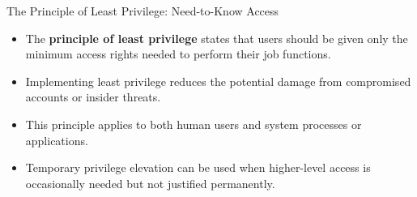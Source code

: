 \documentclass{beamer}
\begin{document}
\begin{frame}{The Principle of Least Privilege: Need-to-Know Access}
    \begin{itemize}
        \item The \textbf{principle of least privilege} states that users should be given only the minimum access rights needed to perform their job functions.
        \item Implementing least privilege reduces the potential damage from compromised accounts or insider threats.
        \item This principle applies to both human users and system processes or applications.
        \item Temporary privilege elevation can be used when higher-level access is occasionally needed but not justified permanently.
    \end{itemize}
    
\end{frame}
\end{document}
